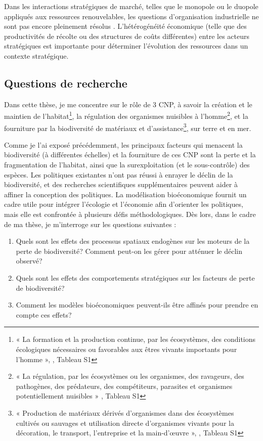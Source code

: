 Dans les interactions stratégiques de marché, telles que le monopole ou le duopole appliqués aux ressources renouvelables, les questions d'organisation industrielle ne sont pas encore pleinement résolus \citep{damania_economics_2007}. L'hétérogénéité économique (telle que des productivités de récolte ou des structures de coûts différentes) entre les acteurs stratégiques est importante pour déterminer l'évolution des ressources dans un contexte stratégique.

\clearpage
{}
{}
\subsection*{Questions de recherche}

 
Dans cette thèse, je me concentre sur le rôle de 3 CNP, à savoir la création et le maintien de l'habitat\footnote{« La formation et la production continue, par les écosystèmes, des conditions écologiques nécessaires ou favorables aux êtres vivants importants pour l'homme », \citep{diaz_2018}, Tableau S1}, la régulation des organismes nuisibles à l'homme\footnote{« La régulation, par les écosystèmes ou les organismes, des ravageurs, des pathogènes, des prédateurs, des compétiteurs, parasites et organismes potentiellement nuisibles » \citep{diaz_2018}, Tableau S1}, et la fourniture par la biodiversité de matériaux et d'assistance\footnote{« Production de matériaux dérivés d'organismes dans des écosystèmes cultivés ou sauvages et utilisation directe d'organismes vivants pour la décoration, le transport, l'entreprise et la main-d'œuvre », \citep{diaz_2018}, Tableau S1}, sur terre et en mer. 

Comme je l'ai exposé précédemment, les principaux facteurs qui menacent la biodiversité (à différentes échelles) et la fourniture de ces CNP sont la perte et la fragmentation de l'habitat, ainsi que la surexploitation (et le sous-contrôle) des espèces. Les politiques existantes n'ont pas réussi à enrayer le déclin de la biodiversité, et des recherches scientifiques supplémentaires peuvent aider à affiner la conception des politiques. La modélisation bioéconomique fournit un cadre utile pour intégrer l'écologie et l'économie afin d'orienter les politiques, mais elle est confrontée à plusieurs défis méthodologiques. Dès lors, dans le cadre de ma thèse, je m'interroge sur les questions suivantes : 
\begin{displayquote}
\begin{enumerate}
\item Quels sont les effets des processus spatiaux endogènes sur les moteurs de la perte de biodiversité? Comment peut-on les gérer pour atténuer le déclin observé?
\item Quels sont les effets des comportements stratégiques sur les facteurs de perte de biodiversité?
\item Comment les modèles bioéconomiques peuvent-ils être affinés pour prendre en compte ces effets?
\end{enumerate}
\end{displayquote}

